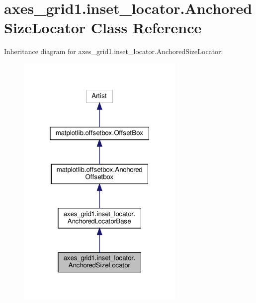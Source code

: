 \hypertarget{classaxes__grid1_1_1inset__locator_1_1AnchoredSizeLocator}{}\section{axes\+\_\+grid1.\+inset\+\_\+locator.\+Anchored\+Size\+Locator Class Reference}
\label{classaxes__grid1_1_1inset__locator_1_1AnchoredSizeLocator}


Inheritance diagram for axes\+\_\+grid1.\+inset\+\_\+locator.\+Anchored\+Size\+Locator\+:
\nopagebreak
\begin{figure}[H]
\begin{center}
\leavevmode
\includegraphics[width=229pt]{classaxes__grid1_1_1inset__locator_1_1AnchoredSizeLocator__inherit__graph}
\end{center}
\end{figure}


